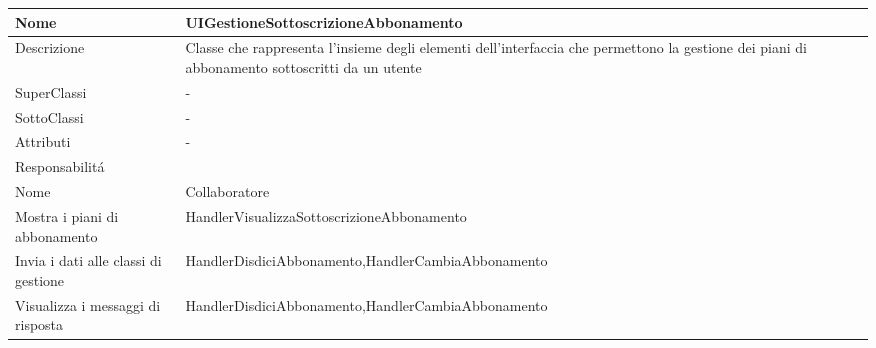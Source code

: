\begin{center}
    \begin{longtable}{ |p{3cm}|p{3cm}|p{3cm}|p{3cm}| }
        \hline
        Nome & \multicolumn{3}{|p{9cm}|}{UIGestioneSottoscrizioneAbbonamento} \\\hline
        Descrizione & \multicolumn{3}{|p{9cm}|}{Classe che rappresenta l'insieme degli elementi dell'interfaccia che permettono la gestione dei piani di abbonamento sottoscritti da un utente} \\\hline
        SuperClassi & \multicolumn{3}{|p{9cm}|}{-} \\\hline
        SottoClassi & \multicolumn{3}{|p{9cm}|}{-} \\\hline
        Attributi & \multicolumn{3}{|p{9cm}|}{-} \\\hline
        \multicolumn{4}{|p{12cm}|}{Responsabilit\'a} \\\hline
        \multicolumn{2}{|p{5cm}|}{Nome} & \multicolumn{2}{|p{7cm}|}{Collaboratore} \\\hline
        \multicolumn{2}{|p{5cm}|}{Mostra i piani di abbonamento} & \multicolumn{2}{|p{7cm}|}{HandlerVisualizzaSottoscrizioneAbbonamento} \\\hline
        \multicolumn{2}{|p{5cm}|}{Invia i dati alle classi di gestione} & \multicolumn{2}{|p{7cm}|}{HandlerDisdiciAbbonamento,\newline HandlerCambiaAbbonamento} \\\hline
        \multicolumn{2}{|p{5cm}|}{Visualizza i messaggi di risposta} & \multicolumn{2}{|p{7cm}|}{HandlerDisdiciAbbonamento,\newline HandlerCambiaAbbonamento} \\\hline
    \end{longtable}
\end{center}

